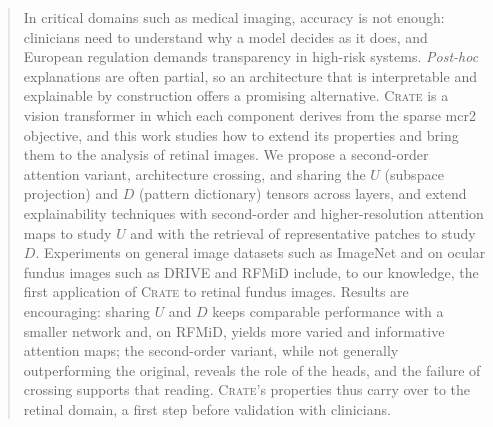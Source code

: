 \begin{abstract}
\begin{segundoresumo}
					In critical domains such as medical imaging, accuracy is not enough: clinicians need to understand why a model decides as it does, and European regulation demands transparency in high-risk systems. \emph{Post-hoc} explanations are often partial, so an architecture that is interpretable and explainable by construction offers a promising alternative. \textsc{Crate} is a vision transformer in which each component derives from the sparse \acrfull{mcr2} objective, and this work studies how to extend its properties and bring them to the analysis of retinal images. We propose a second-order attention variant, architecture crossing, and sharing the $U$ (subspace projection) and $D$ (pattern dictionary) tensors across layers, and extend explainability techniques with second-order and higher-resolution attention maps to study $U$ and with the retrieval of representative patches to study $D$. Experiments on general image datasets such as ImageNet and on ocular fundus images such as DRIVE and RFMiD include, to our knowledge, the first application of \textsc{Crate} to retinal fundus images. Results are encouraging: sharing $U$ and $D$ keeps comparable performance with a smaller network and, on RFMiD, yields more varied and informative attention maps; the second-order variant, while not generally outperforming the original, reveals the role of the heads, and the failure of crossing supports that reading. \textsc{Crate}'s properties thus carry over to the retinal domain, a first step before validation with clinicians.
  \end{segundoresumo}
\vspace*{25pt}

\end{abstract}
\pagestyle{fancy}


